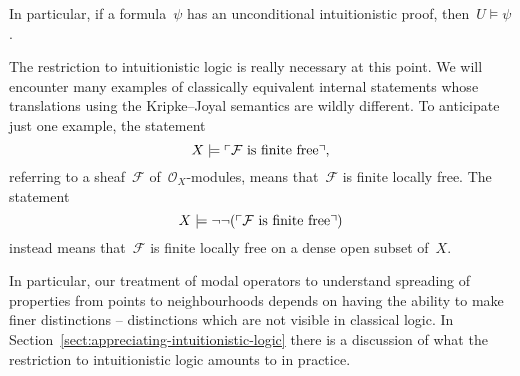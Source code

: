 \documentclass[10pt,reqno,a4paper]{amsbook}
\theoremstyle{definition}
\theoremstyle{plain}
\theoremstyle{remark}
\newcommand{\F}{\mathcal{F}}
\renewcommand{\O}{\mathcal{O}}
\newcommand{\?}{\,{:}\,}
\renewcommand{\_}{\mathpunct{.}\,}
\newcommand{\speak}[1]{\ulcorner\text{\textnormal{#1}}\urcorner}
\newcommand{\XXXh}[1]{}
\begin{document}
In particular, if a formula~$\psi$ has an unconditional intuitionistic proof,
then~$U \models \psi$.

The restriction to intuitionistic logic is really necessary at this point. We
will encounter many examples of classically equivalent internal statements whose
translations using the Kripke--Joyal semantics are wildly different. To
anticipate just one example, the statement
\[ X \models \speak{$\F$ is finite free}, \]
referring to a sheaf~$\F$ of~$\O_X$-modules, means that~$\F$ is finite locally
free. The statement
\[ X \models \neg\neg(\speak{$\F$ is finite free}) \]
instead means that~$\F$ is finite locally free on a dense open subset of~$X$.

In
particular, our treatment of modal operators to understand spreading of
properties from points to neighbourhoods depends on having the ability to make
finer distinctions -- distinctions which are not visible in classical logic.
In Section~\ref{sect:appreciating-intuitionistic-logic} there is a discussion of what the restriction to
intuitionistic logic amounts to in practice.

\XXXh{Put rules into an appendix and give some explanation regarding contexts
etc. Don't forget the rules for $\in$, $\bigwedge$, $\bigvee$.}
\end{document}

